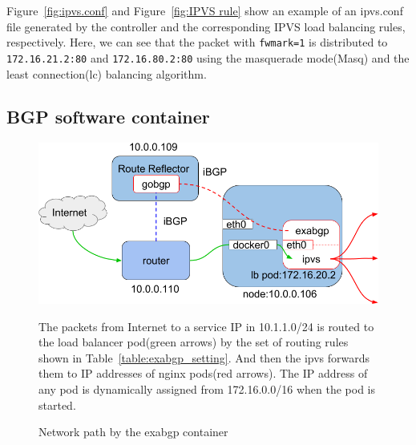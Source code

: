 Figure~\ref{fig:ipvs.conf} and Figure~\ref{fig:IPVS rule} show an example of an ipvs.conf file 
generated by the controller and the corresponding IPVS load balancing rules, respectively.
Here, we can see that the packet with {\tt fwmark=1}\cite{BertHubert2002} is distributed 
to {\tt 172.16.21.2:80} and {\tt 172.16.80.2:80} 
using the masquerade mode(Masq) and 
the least connection(lc)\cite{Zhang2000} balancing algorithm.

\subsection{BGP software container}\label{sec:bgp}

\begin{figure}[tb]
  \begin{center}
    \includegraphics[width=0.8\columnwidth]{Figs/exabgp}
    \caption{Network path by the exabgp container}
    \label{fig:exabgp_schem}
  
    \parbox[c]{0.9\columnwidth}{
      The packets from Internet to a service IP in 10.1.1.0/24 is routed to the load balancer pod(green arrows) by the set of routing rules shown in Table~\ref{table:exabgp_setting}.
      And then the ipvs forwards them to IP addresses of nginx pods(red arrows).
      The IP address of any pod is dynamically assigned from 172.16.0.0/16 when the pod is started. 
    }
  \end{center}
\end{figure}

